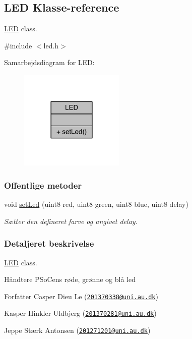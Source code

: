 \hypertarget{class_l_e_d}{}\subsection{L\+ED Klasse-\/reference}
\label{class_l_e_d}


\hyperlink{class_l_e_d}{L\+ED} class.  




{\ttfamily \#include $<$led.\+h$>$}



Samarbejdsdiagram for L\+ED\+:\nopagebreak
\begin{figure}[H]
\begin{center}
\leavevmode
\includegraphics[width=141pt]{d3/df9/class_l_e_d__coll__graph}
\end{center}
\end{figure}
\subsubsection*{Offentlige metoder}
\begin{DoxyCompactItemize}
\item 
void \hyperlink{class_l_e_d_a1d8e725e3829da99c1d027ba0a2ce57a}{set\+Led} (uint8 red, uint8 green, uint8 blue, uint8 delay)
\begin{DoxyCompactList}\small\item\em Sætter den defineret farve og angivet delay. \end{DoxyCompactList}\end{DoxyCompactItemize}


\subsubsection{Detaljeret beskrivelse}
\hyperlink{class_l_e_d}{L\+ED} class. 

Håndtere P\+SoC\textquotesingle{}ens røde, grønne og blå led \begin{DoxyAuthor}{Forfatter}
Casper Dieu Le (\href{mailto:201370338@uni.au.dk}{\tt 201370338@uni.\+au.\+dk}) 

Kasper Hinkler Uldbjerg (\href{mailto:201370281@uni.au.dk}{\tt 201370281@uni.\+au.\+dk}) 

Jeppe Stærk Antonsen (\href{mailto:201271201@uni.au.dk}{\tt 201271201@uni.\+au.\+dk}) 
\end{DoxyAuthor}


